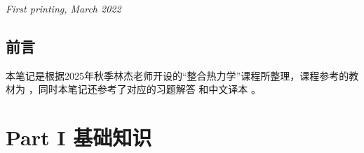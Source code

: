 \documentclass[
	11pt, %
	fleqn, %
	a4paper, %
	oneside, %
]{LegrandOrangeBook}
\begin{document}
\noindent \textit{First printing, March 2022} %


\pagestyle{empty} %

\tableofcontents %



\pagestyle{fancy} %

\cleardoublepage %


\chapterimage{} 
\chapterspaceabove{2.5cm}
\chapterspacebelow{2cm}

\chapter*{前言}

本笔记是根据2025年秋季林杰老师开设的``整合热力学''课程所整理，课程参考的教材为  \cite{schroeder2021thermal}，同时本笔记还参考了对应的习题解答 \cite{schroeder2001thermalSolutions} 和中文译本 \cite{schroeder2022thermalCN}。

\part{Part I 基础知识}

\chapterspaceabove{6.75cm} %
\chapterspacebelow{7.25cm} %
\end{document}
